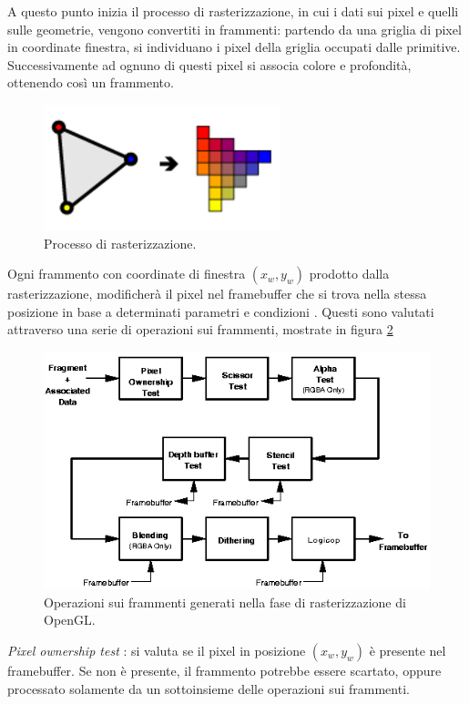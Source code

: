 A questo punto inizia il processo di rasterizzazione, in cui i dati sui pixel e quelli sulle geometrie, vengono convertiti in frammenti: partendo da una griglia di pixel in coordinate finestra, si individuano i pixel della griglia occupati dalle primitive. Successivamente ad ognuno di questi pixel si associa colore e profondità, ottenendo così un frammento. 
\\
\begin{figure}[htb]
 \centering
 \includegraphics[width=0.4\linewidth]{images/chapter_stato_arte/stato_arte_raster.png}\hfill
 \caption[Rasterizzazione OpenGL]{Processo di rasterizzazione.}
 \label{fig:stato_arte_raster}
\end{figure}

Ogni frammento con coordinate di finestra $(x_w,y_w)$ prodotto dalla rasterizzazione, modificherà il pixel nel framebuffer che si trova nella stessa posizione in base a determinati parametri e condizioni \cite{open12} . Questi sono valutati attraverso una serie di operazioni sui frammenti, mostrate in figura \ref{fig:stato_arte_frag_op}
\begin{figure}[htb]
 \centering
 \includegraphics[width=0.9\linewidth]{images/chapter_stato_arte/stato_arte_frag_op.png}\hfill
 \caption[Operazioni sui frammenti]{Operazioni sui frammenti generati nella fase di rasterizzazione di OpenGL.}
 \label{fig:stato_arte_frag_op}
\end{figure}
\emph{Pixel ownership test} : si valuta se il pixel in posizione $(x_w,y_w)$ è presente nel framebuffer. Se non è presente, il frammento potrebbe essere scartato, oppure processato solamente da un sottoinsieme delle operazioni sui frammenti.
\\


